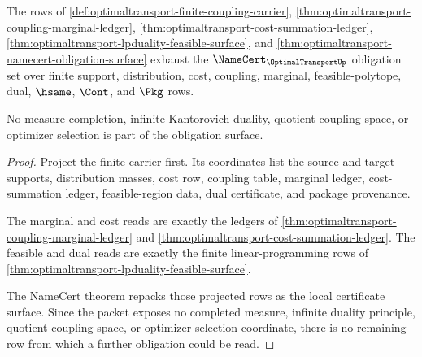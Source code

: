 \begin{theorem}
\label{thm:optimaltransport-obligation-closure}
The rows of \autoref{def:optimaltransport-finite-coupling-carrier},
\autoref{thm:optimaltransport-coupling-marginal-ledger},
\autoref{thm:optimaltransport-cost-summation-ledger},
\autoref{thm:optimaltransport-lpduality-feasible-surface}, and
\autoref{thm:optimaltransport-namecert-obligation-surface} exhaust the
$\NameCert_{\OptimalTransportUp}$ obligation set over finite support,
distribution, cost, coupling, marginal, feasible-polytope, dual, $\hsame$,
$\Cont$, and $\Pkg$ rows.

No measure completion, infinite Kantorovich duality, quotient coupling space, or
optimizer selection is part of the obligation surface.
\end{theorem}
\begin{proof}
Project the finite carrier first. Its coordinates list the source and target
supports, distribution masses, cost row, coupling table, marginal ledger,
cost-summation ledger, feasible-region data, dual certificate, and package
provenance.

The marginal and cost reads are exactly the ledgers of
\autoref{thm:optimaltransport-coupling-marginal-ledger} and
\autoref{thm:optimaltransport-cost-summation-ledger}. The feasible and dual
reads are exactly the finite linear-programming rows of
\autoref{thm:optimaltransport-lpduality-feasible-surface}.

The NameCert theorem repacks those projected rows as the local certificate
surface. Since the packet exposes no completed measure, infinite duality
principle, quotient coupling space, or optimizer-selection coordinate, there is
no remaining row from which a further obligation could be read.
\end{proof}

